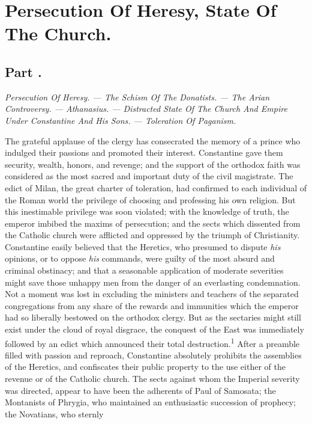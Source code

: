 \chapter{Persecution Of Heresy, State Of The Church.}
\section{Part \thesection.}

\textit{Persecution Of Heresy. — The Schism Of The Donatists. — The Arian
Controversy. — Athanasius. — Distracted State Of The Church And Empire
Under Constantine And His Sons. — Toleration Of Paganism.}
\vspace{\onelineskip}

The grateful applause of the clergy has consecrated the memory of
a prince who indulged their passions and promoted their interest.
Constantine gave them security, wealth, honors, and revenge; and
the support of the orthodox faith was considered as the most
sacred and important duty of the civil magistrate. The edict of
Milan, the great charter of toleration, had confirmed to each
individual of the Roman world the privilege of choosing and
professing his own religion. But this inestimable privilege was
soon violated; with the knowledge of truth, the emperor imbibed
the maxims of persecution; and the sects which dissented from the
Catholic church were afflicted and oppressed by the triumph of
Christianity. Constantine easily believed that the Heretics, who
presumed to dispute \textit{his} opinions, or to oppose \textit{his} commands,
were guilty of the most absurd and criminal obstinacy; and that a
seasonable application of moderate severities might save those
unhappy men from the danger of an everlasting condemnation. Not a
moment was lost in excluding the ministers and teachers of the
separated congregations from any share of the rewards and
immunities which the emperor had so liberally bestowed on the
orthodox clergy. But as the sectaries might still exist under the
cloud of royal disgrace, the conquest of the East was immediately
followed by an edict which announced their total destruction.\textsuperscript{1}
After a preamble filled with passion and reproach, Constantine
absolutely prohibits the assemblies of the Heretics, and
confiscates their public property to the use either of the
revenue or of the Catholic church. The sects against whom the
Imperial severity was directed, appear to have been the adherents
of Paul of Samosata; the Montanists of Phrygia, who maintained an
enthusiastic succession of prophecy; the Novatians, who sternly

